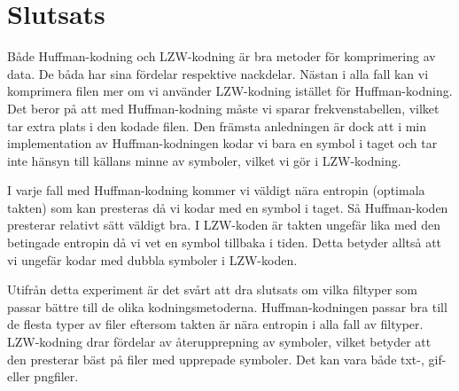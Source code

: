 
\chapter{Slutsats}
\label{cha:conclusion}

Både Huffman-kodning och LZW-kodning är bra metoder för komprimering av data. De båda har sina fördelar respektive nackdelar. Nästan i alla fall kan vi komprimera filen mer om vi använder LZW-kodning istället för Huffman-kodning. Det beror på att med Huffman-kodning måste vi sparar frekvenstabellen, vilket tar extra plats i den kodade filen. Den främsta anledningen är dock att i min implementation av Huffman-kodningen kodar vi bara en symbol i taget och tar inte hänsyn till källans minne av symboler, vilket vi gör i LZW-kodning.

I varje fall med Huffman-kodning kommer vi väldigt nära entropin (optimala takten) som kan presteras då vi kodar med en symbol i taget. Så Huffman-koden presterar relativt sätt väldigt bra. I LZW-koden är takten ungefär lika med den betingade entropin då vi vet en symbol tillbaka i tiden. Detta betyder alltså att vi ungefär kodar med dubbla symboler i LZW-koden.

Utifrån detta experiment är det svårt att dra slutsats om vilka filtyper som passar bättre till de olika kodningsmetoderna. Huffman-kodningen passar bra till de flesta typer av filer eftersom takten är nära entropin i alla fall av filtyper. LZW-kodning drar fördelar av återupprepning av symboler, vilket betyder att den presterar bäst på filer med upprepade symboler. Det kan vara både txt-, gif- eller pngfiler.


